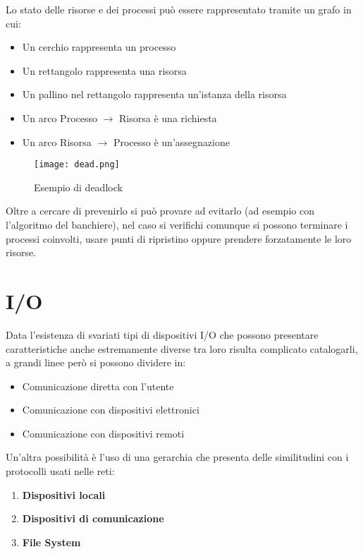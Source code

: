 \documentclass{article}
\begin{document}
\noindent Lo stato delle risorse e dei processi può essere rappresentato tramite un grafo in cui:
\begin{itemize}
    \item Un cerchio rappresenta un processo
    \item Un rettangolo rappresenta una risorsa
    \item Un pallino nel rettangolo rappresenta un'istanza della risorsa
    \item Un arco Processo $\rightarrow$ Risorsa è una richiesta
    \item Un arco Risorsa $\rightarrow$ Processo è un'assegnazione\newline
\end{itemize}

\begin{figure}[ht]
    \centering
    \texttt{[image: dead.png]}
    \caption{Esempio di deadlock}
    \label{fig:deadlock}
\end{figure}

\noindent Oltre a cercare di prevenirlo si può provare ad evitarlo (ad esempio con l'algoritmo del banchiere), nel caso si verifichi comunque si possono terminare i processi coinvolti, usare punti di ripristino oppure prendere forzatamente le loro risorse.

\section{I/O}

Data l'esistenza di svariati tipi di dispositivi I/O che possono presentare caratteristiche anche estremamente diverse tra loro risulta complicato catalogarli, a grandi linee però si possono dividere in:
\begin{itemize}
    \item Comunicazione diretta con l'utente
    \item Comunicazione con dispositivi elettronici
    \item Comunicazione con dispositivi remoti\newline
\end{itemize}

\noindent Un'altra possibilità è l'uso di una gerarchia che presenta delle similitudini con i protocolli usati nelle reti:
\begin{enumerate}
    \item \textbf{Dispositivi locali}
    \item \textbf{Dispositivi di comunicazione}
    \item \textbf{File System}\newline
\end{enumerate}
\end{document}
